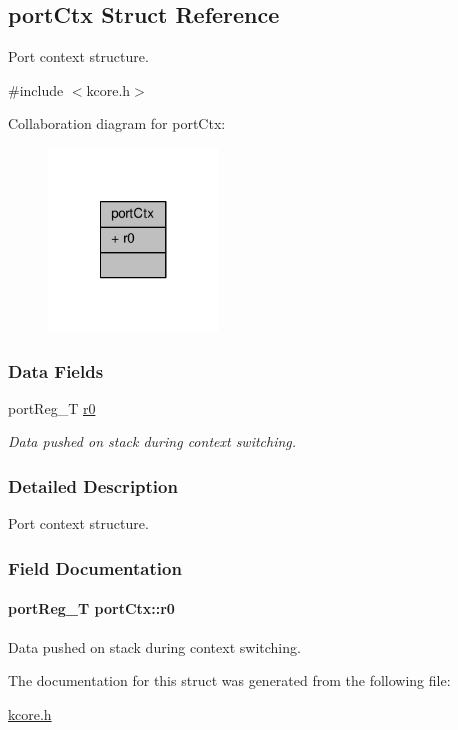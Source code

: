 \hypertarget{structportCtx}{\subsection{port\-Ctx Struct Reference}
\label{structportCtx}
}


Port context structure.  




{\ttfamily \#include $<$kcore.\-h$>$}



Collaboration diagram for port\-Ctx\-:\nopagebreak
\begin{figure}[H]
\begin{center}
\leavevmode
\includegraphics[width=128pt]{structportCtx__coll__graph}
\end{center}
\end{figure}
\subsubsection*{Data Fields}
\begin{DoxyCompactItemize}
\item 
port\-Reg\-\_\-\-T \hyperlink{structportCtx_a0ee17f42c9b473ddb96365e05c71f086}{r0}
\begin{DoxyCompactList}\small\item\em Data pushed on stack during context switching. \end{DoxyCompactList}\end{DoxyCompactItemize}


\subsubsection{Detailed Description}
Port context structure. 

\subsubsection{Field Documentation}
\hypertarget{structportCtx_a0ee17f42c9b473ddb96365e05c71f086}{
\paragraph[{r0}]{\setlength{\rightskip}{0pt plus 5cm}port\-Reg\-\_\-\-T port\-Ctx\-::r0}}\label{structportCtx_a0ee17f42c9b473ddb96365e05c71f086}


Data pushed on stack during context switching. 



The documentation for this struct was generated from the following file\-:\begin{DoxyCompactItemize}
\item 
\hyperlink{kcore_8h}{kcore.\-h}\end{DoxyCompactItemize}
